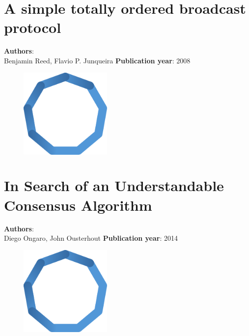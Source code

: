 \documentclass[11pt,fleqn]{book} %
\begin{document}
\chapter{A simple totally ordered broadcast protocol}
\vspace*{-7mm}
\Large \textbf{Authors}: \\
Benjamin Reed, Flavio P. Junqueira
\newline\newline
\textbf{Publication year}: 2008
\begin{figure}[b]
    \centering
    \includegraphics[width=0.4\textwidth]{distributed-systems-blue.pdf}
\end{figure}


\chapter{In Search of an Understandable Consensus Algorithm}
\vspace*{-7mm}
\Large \textbf{Authors}: \\
Diego Ongaro, John Ousterhout
\newline\newline
\textbf{Publication year}: 2014
\begin{figure}[b]
    \centering
    \includegraphics[width=0.4\textwidth]{distributed-systems-blue.pdf}
\end{figure}

\end{document}
